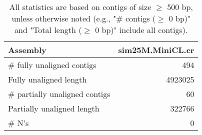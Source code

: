 \documentclass[12pt,a4paper]{article}
\begin{document}
\begin{table}[ht]
\begin{center}
\caption{All statistics are based on contigs of size $\geq$ 500 bp, unless otherwise noted (e.g., "\# contigs ($\geq$ 0 bp)" and "Total length ($\geq$ 0 bp)" include all contigs).}
\begin{tabular}{|l*{1}{|r}|}
\hline
Assembly & sim25M.MiniCL.cr \\ \hline
\# fully unaligned contigs & 494 \\ \hline
Fully unaligned length & 4923025 \\ \hline
\# partially unaligned contigs & 60 \\ \hline
Partially unaligned length & 322766 \\ \hline
\# N's & 0 \\ \hline
\end{tabular}
\end{center}
\end{table}
\end{document}
